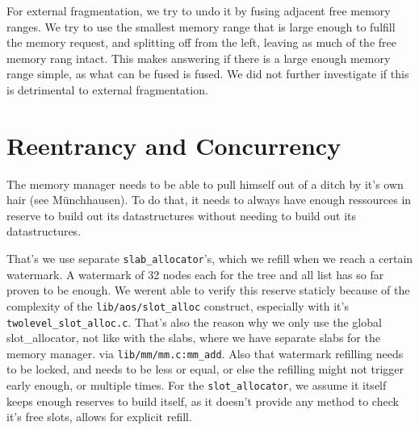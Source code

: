 For external fragmentation, we try to undo it by fusing adjacent free memory
ranges.
We try to use the smallest memory range that is large enough to fulfill the
memory request, and splitting off from the left, leaving as much of the free
memory rang intact.
This makes answering if there is a large enough memory range simple, as what
can be fused is fused.
We did not further investigate if this is detrimental to external fragmentation.

% 
% 
% 

\section{Reentrancy and Concurrency}\label{mem-con}

The memory manager needs to be able to pull himself out of a ditch by it's own
hair (see Münchhausen).
To do that, it needs to always have enough ressources in reserve to build out
its datastructures without needing to build out its datastructures.

That's we use separate \verb|slab_allocator|'s, which we refill when we reach a
certain watermark.
A watermark of 32 nodes each for the tree and all list has so far proven to be
enough.
We werent able to verify this reserve staticly because of the complexity of the
\verb|lib/aos/slot_alloc| construct, especially with it's
\verb|twolevel_slot_alloc.c|.
That's also the reason why we only use the global slot\_allocator, not like with
the slabs, where we have separate slabs for the memory manager.
via \verb|lib/mm/mm.c:mm_add|.
Also that watermark refilling needs to be locked, and needs to be less or equal,
or else the refilling might not trigger early enough, or multiple times.
For the \verb|slot_allocator|, we assume it itself keeps enough reserves to build
itself, as it doesn't provide any method to check it's free slots, allows for
explicit refill.

